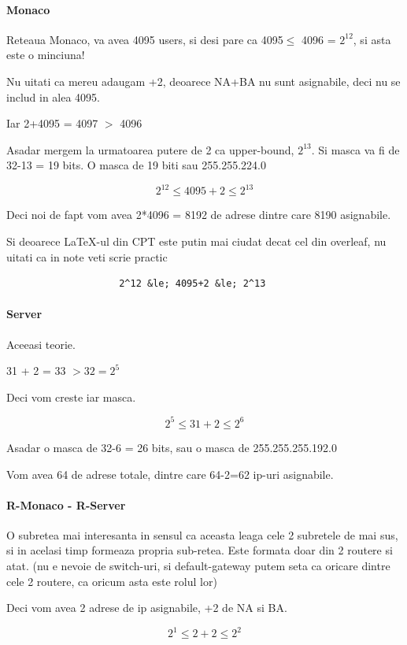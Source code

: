 \documentclass{article}
\begin{document}
\paragraph{Monaco}
Reteaua Monaco, va avea 4095 users, si desi pare ca 4095$\leq$ 4096 = $2^{12}$, si asta este o minciuna!

Nu uitati ca mereu adaugam +2, deoarece NA+BA nu sunt asignabile, deci nu se includ in alea 4095.

Iar 2+4095 = 4097 $>$ 4096

Asadar mergem la urmatoarea putere de 2 ca upper-bound, $2^{13}$. Si masca va fi de 32-13 = 19 bits. O masca de 19 biti sau 255.255.224.0

\[2^{12} \leq 4095+2 \leq 2^{13}\]

Deci noi de fapt vom avea 2*4096 = 8192 de adrese dintre care 8190 asignabile.

Si deoarece LaTeX-ul din CPT este putin mai ciudat decat cel din overleaf, nu uitati ca in note veti scrie practic 

\begin{verbatim}
                    2^12 &le; 4095+2 &le; 2^13
\end{verbatim}

\paragraph{Server}
Aceeasi teorie.

31 + 2 = 33 $>32 = 2^5$ 

Deci vom creste iar masca.

\[2^{5} \leq 31+2 \leq 2^{6}\]

Asadar o masca de 32-6 = 26 bits, sau o masca de 255.255.255.192.0

Vom avea 64 de adrese totale, dintre care 64-2=62 ip-uri asignabile.

\paragraph{R-Monaco - R-Server}

O subretea mai interesanta in sensul ca aceasta leaga cele 2 subretele de mai sus, si in acelasi timp formeaza propria sub-retea. Este formata doar din 2 routere si atat. (nu e nevoie de switch-uri, si default-gateway putem seta ca oricare dintre cele 2 routere, ca oricum asta este rolul lor)

Deci vom avea 2 adrese de ip asignabile, +2 de NA si BA.

\[2^{1} \leq 2+2 \leq 2^{2}\]
\end{document}
